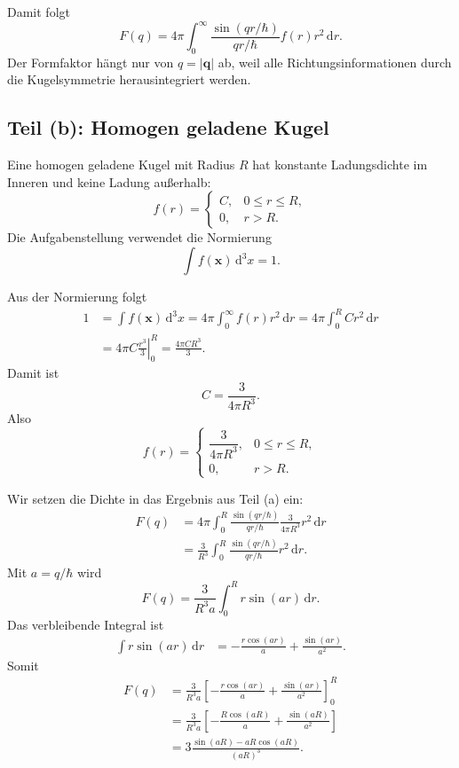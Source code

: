 \documentclass[11pt,a4paper]{scrartcl}
\newcommand{\abs}[1]{\left| #1 \right|}
\newcommand{\dd}{\,\mathrm{d}}
\newcommand{\vect}[1]{\bm{#1}}
\begin{document}
\begin{answerbox}
Damit folgt
\[
    \boxed{F(q)=4\pi\int_0^\infty \frac{\sin(qr/\hbar)}{qr/\hbar}f(r)r^2\dd r.}
\]
Der Formfaktor h\"angt nur von $q=\abs{\vect{q}}$ ab, weil alle Richtungsinformationen durch die Kugelsymmetrie herausintegriert werden.
\end{answerbox}

\subsection{Teil (b): Homogen geladene Kugel}

\begin{definitionbox}[title=Ladungsverteilung einer homogen geladenen Kugel]
Eine homogen geladene Kugel mit Radius $R$ hat konstante Ladungsdichte im Inneren und keine Ladung au\ss{}erhalb:
\[
    f(r)=\begin{cases}
        C, & 0\le r\le R,\\
        0, & r>R.
    \end{cases}
\]
Die Aufgabenstellung verwendet die Normierung
\[
    \int f(\vect{x})\dd^3x=1.
\]
\end{definitionbox}

\begin{calculationbox}[title=Normierung der Ladungsdichte]
Aus der Normierung folgt
\begin{align*}
    1&=\int f(\vect{x})\dd^3x
      =4\pi\int_0^\infty f(r)r^2\dd r
      =4\pi\int_0^R Cr^2\dd r\\
     &=4\pi C\left.\frac{r^3}{3}\right|_0^R
      =\frac{4\pi CR^3}{3}.
\end{align*}
Damit ist
\[
    C=\frac{3}{4\pi R^3}.
\]
Also
\[
    f(r)=\begin{cases}
        \dfrac{3}{4\pi R^3}, & 0\le r\le R,\\[0.4em]
        0, & r>R.
    \end{cases}
\]
\end{calculationbox}

\begin{calculationbox}[title=Einsetzen in den Formfaktor]
Wir setzen die Dichte in das Ergebnis aus Teil (a) ein:
\begin{align*}
    F(q)&=4\pi\int_0^R \frac{\sin(qr/\hbar)}{qr/\hbar}\frac{3}{4\pi R^3}r^2\dd r\\
        &=\frac{3}{R^3}\int_0^R \frac{\sin(qr/\hbar)}{qr/\hbar}r^2\dd r.
\end{align*}
Mit $a=q/\hbar$ wird
\[
    F(q)=\frac{3}{R^3a}\int_0^R r\sin(ar)\dd r.
\]
Das verbleibende Integral ist
\begin{align*}
    \int r\sin(ar)\dd r
    &=-\frac{r\cos(ar)}{a}+\frac{\sin(ar)}{a^2}.
\end{align*}
Somit
\begin{align*}
    F(q)&=\frac{3}{R^3a}\left[-\frac{r\cos(ar)}{a}+\frac{\sin(ar)}{a^2}\right]_0^R\\
        &=\frac{3}{R^3a}\left[-\frac{R\cos(aR)}{a}+\frac{\sin(aR)}{a^2}\right]\\
        &=3\frac{\sin(aR)-aR\cos(aR)}{(aR)^3}.
\end{align*}
\end{calculationbox}
\end{document}
